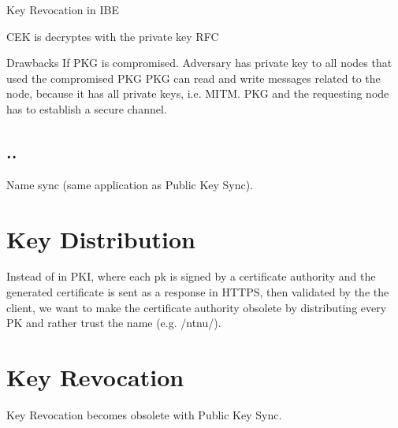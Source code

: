 Key Revocation in IBE ~\cite{DBLP:journals/iacr/BoldyrevaGK12} 

\gls{CEK} is decryptes with the private key
RFC~\cite{rfc5408}

Drawbacks
If \gls{PKG} is compromised. Adversary has private key to all nodes that used the compromised \gls{PKG}
\gls{PKG} can read and write messages related to the node, because it has all private keys, i.e. \gls{MITM}.
\gls{PKG} and the requesting node has to establish a secure channel. 

\subsection{..}
Name sync (same application as Public Key Sync).


\section{Key Distribution}
Instead of in \gls{PKI}, where each pk is signed by a certificate authority and the generated certificate is sent as a response in \gls{HTTPS}, then validated by the the client, we want to make the certificate authority obsolete by distributing every PK and rather trust the name (e.g. /ntnu/). 

\section{Key Revocation}
Key Revocation becomes obsolete with Public Key Sync. 
